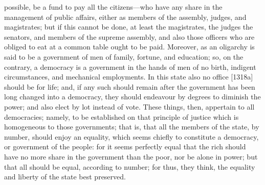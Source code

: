 possible, be a fund to pay all the citizens—who have any share in
the management of public affairs, either as members of the assembly,
judges, and magistrates; but if this cannot be done, at least the
magistrates, the judges the senators, and members of the supreme assembly,
and also those officers who are obliged to eat at a common table ought to
be paid. Moreover, as an oligarchy is said to be a government of men of
family, fortune, and education; so, on the contrary, a democracy is a
government in the hands of men of no birth, indigent circumstances, and
mechanical employments. In this state also no office [1318a] should be for
life; and, if any such should remain after the government has been long
changed into a democracy, they should endeavour by degrees to diminish the
power; and also elect by lot instead of vote. These things, then,
appertain to all democracies; namely, to be established on that principle
of justice which is homogeneous to those governments; that is, that all
the members of the state, by number, should enjoy an equality, which seems
chiefly to constitute a democracy, or government of the people: for it
seems perfectly equal that the rich should have no more share in the
government than the poor, nor be alone in power; but that all should be
equal, according to number; for thus, they think, the equality and liberty
of the state best preserved.


